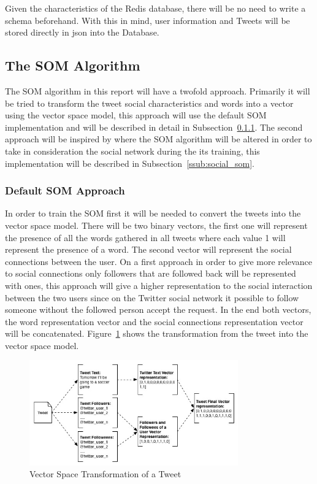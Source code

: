 Given the characteristics of the Redis database, there will be no need to write a schema beforehand. With this in mind, user information and Tweets will be stored directly in json into the Database.

\subsection{The SOM Algorithm} %
\label{sub:implementing_the_som}
The SOM algorithm in this report will have a twofold approach. Primarily it will be tried to transform the tweet social characteristics and words into a vector using the vector space model, this approach will use the default SOM implementation and will be described in detail in Subsection~\ref{ssub:default_som_approach_}. The second approach will be inspired by \citet{Bacao2005} where the SOM algorithm will be altered in order to take in consideration the social network during the its training, this implementation will be described in Subsection~\ref{ssub:social_som}.

\subsubsection{Default SOM Approach } %
\label{ssub:default_som_approach_} In order to train the SOM first it will be needed to convert the tweets into the vector space model. There will be two binary vectors, the first one will represent the presence of all the words gathered in all tweets where each value 1 will  represent the presence of a word. The second vector will represent the social connections between the user. On a first approach in order to  give more relevance to social connections only followers that are followed back will be represented with ones, this approach will give a higher representation to the social interaction between the two users since on the Twitter social network it possible to follow someone without the followed person accept the request. In the end both vectors, the word representation vector and the social connections representation vector will be concatenated. Figure~\ref{fig:vsm} shows the transformation from the tweet into the vector space model. 

\begin{figure}[tb]
  \begin{center}
    \includegraphics[width=9cm]{images/10_tweet_svm_transform.jpg}
  \end{center}
  \caption{Vector Space Transformation of a Tweet}
  \label{fig:vsm}
\end{figure}

